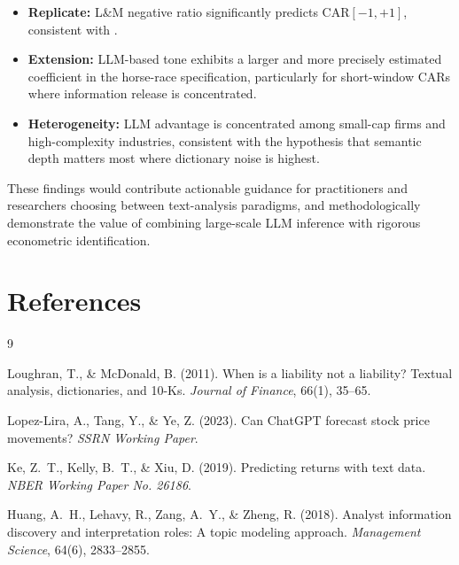 \documentclass[12pt]{article}
\begin{document}
\begin{itemize}[leftmargin=1.5em, noitemsep]
    \item \textbf{Replicate:} L\&M negative ratio significantly predicts
    $\text{CAR}[-1,+1]$, consistent with \citet{LoughranMcDonald2011}.
    \item \textbf{Extension:} LLM-based tone exhibits a larger and more precisely
    estimated coefficient in the horse-race specification, particularly for
    short-window CARs where information release is concentrated.
    \item \textbf{Heterogeneity:} LLM advantage is concentrated among small-cap
    firms and high-complexity industries, consistent with the hypothesis that
    semantic depth matters most where dictionary noise is highest.
\end{itemize}

These findings would contribute actionable guidance for practitioners and
researchers choosing between text-analysis paradigms, and methodologically
demonstrate the value of combining large-scale LLM inference with rigorous
econometric identification.

\section*{References}

\begin{thebibliography}{9}

Loughran, T., \& McDonald, B. (2011).
\newblock When is a liability not a liability? Textual analysis, dictionaries,
and 10-Ks.
\newblock \textit{Journal of Finance}, 66(1), 35--65.

Lopez-Lira, A., Tang, Y., \& Ye, Z. (2023).
\newblock Can ChatGPT forecast stock price movements?
\newblock \textit{SSRN Working Paper}.

Ke, Z.~T., Kelly, B.~T., \& Xiu, D. (2019).
\newblock Predicting returns with text data.
\newblock \textit{NBER Working Paper No. 26186}.

Huang, A.~H., Lehavy, R., Zang, A.~Y., \& Zheng, R. (2018).
\newblock Analyst information discovery and interpretation roles: A topic
modeling approach.
\newblock \textit{Management Science}, 64(6), 2833--2855.

\end{thebibliography}
\end{document}
